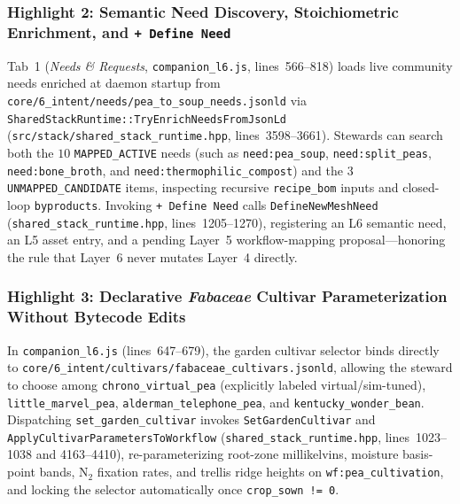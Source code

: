 \subsubsection{Highlight 2: Semantic Need Discovery, Stoichiometric Enrichment, and \texttt{+ Define Need}}
Tab~1 (\textit{Needs \& Requests}, \texttt{companion\_l6.js}, lines~566--818) loads live community needs enriched at daemon startup from \texttt{core/6\_intent/needs/pea\_to\_soup\_needs.jsonld} via \texttt{SharedStackRuntime::TryEnrichNeedsFromJsonLd} (\texttt{src/stack/shared\_stack\_runtime.hpp}, lines~3598--3661). Stewards can search both the $10$ \texttt{MAPPED\_ACTIVE} needs (such as \texttt{need:pea\_soup}, \texttt{need:split\_peas}, \texttt{need:bone\_broth}, and \texttt{need:thermophilic\_compost}) and the $3$ \texttt{UNMAPPED\_CANDIDATE} items, inspecting recursive \texttt{recipe\_bom} inputs and closed-loop \texttt{byproducts}. Invoking \texttt{+ Define Need} calls \texttt{DefineNewMeshNeed} (\texttt{shared\_stack\_runtime.hpp}, lines~1205--1270), registering an L6 semantic need, an L5 asset entry, and a pending Layer~5 workflow-mapping proposal---honoring the rule that Layer~6 never mutates Layer~4 directly.

\subsubsection{Highlight 3: Declarative \textit{Fabaceae} Cultivar Parameterization Without Bytecode Edits}
In \texttt{companion\_l6.js} (lines~647--679), the garden cultivar selector binds directly to \texttt{core/6\_intent/cultivars/fabaceae\_cultivars.jsonld}, allowing the steward to choose among \texttt{chrono\_virtual\_pea} (explicitly labeled virtual/sim-tuned), \texttt{little\_marvel\_pea}, \texttt{alderman\_telephone\_pea}, and \texttt{kentucky\_wonder\_bean}. Dispatching \texttt{set\_garden\_cultivar} invokes \texttt{SetGardenCultivar} and \texttt{ApplyCultivarParametersToWorkflow} (\texttt{shared\_stack\_runtime.hpp}, lines~1023--1038 and 4163--4410), re-parameterizing root-zone millikelvins, moisture basis-point bands, $\mathrm{N}_2$ fixation rates, and trellis ridge heights on \texttt{wf:pea\_cultivation}, and locking the selector automatically once \texttt{crop\_sown != 0}.

